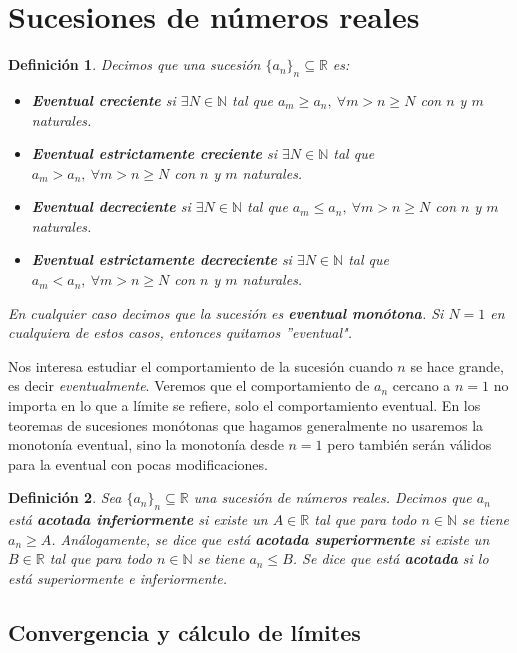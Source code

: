 \documentclass{article}
\newtheorem{define}{Definición}
\begin{document}
\section{Sucesiones de números reales}
\begin{define}Decimos que una sucesión $\{a_n\}_n \subseteq \mathbb{R}$ es:
	\begin{itemize}
		\item
		\textbf{Eventual creciente} si $\exists N \in \mathbb{N}$ tal que $a_m \geq a_n,\ \forall m>n\geq N$ con $n$ y $m$ naturales.
		\item
		\textbf{Eventual estrictamente creciente} si $\exists N \in \mathbb{N}$ tal que $a_m > a_n,\ \forall m>n\geq N$ con $n$ y $m$ naturales.
		\item
		\textbf{Eventual decreciente} si $\exists N \in \mathbb{N}$ tal que $a_m \leq a_n,\ \forall m>n\geq N$ con $n$ y $m$ naturales.
		\item
		\textbf{Eventual estrictamente decreciente} si $\exists N \in \mathbb{N}$ tal que $a_m < a_n,\ \forall m>n\geq N$ con $n$ y $m$ naturales.
	\end{itemize}
	En cualquier caso decimos que la sucesión es \textbf{eventual monótona}. Si $N = 1$ en cualquiera de estos casos, entonces quitamos ''eventual".
\end{define}
Nos interesa estudiar el comportamiento de la sucesión cuando $n$ se hace grande, es decir \textit{eventualmente}. Veremos que el comportamiento de $a_n$ cercano a $n = 1$ no importa
en lo que a límite se refiere, solo el comportamiento eventual. En los teoremas de sucesiones monótonas que hagamos generalmente no usaremos la monotonía eventual, sino la monotonía desde $n = 1$ pero también serán válidos para la eventual con pocas modificaciones.

\begin{define}
	Sea $\{ a_n\}_n \subseteq \mathbb{R}$ una sucesión de números reales. Decimos que $a_n$ está \textbf{acotada inferiormente} si existe un $A \in \mathbb{R}$ tal que para todo $n \in \mathbb{N}$ se tiene $a_n \geq A$. Análogamente, se dice que está \textbf{acotada superiormente} si existe un $B \in \mathbb{R}$ tal que para todo $n \in \mathbb{N}$ se tiene $a_n \leq B$. Se dice que está \textbf{acotada} si lo está superiormente e inferiormente.
\end{define}

\subsection{Convergencia y cálculo de límites}
\end{document}
